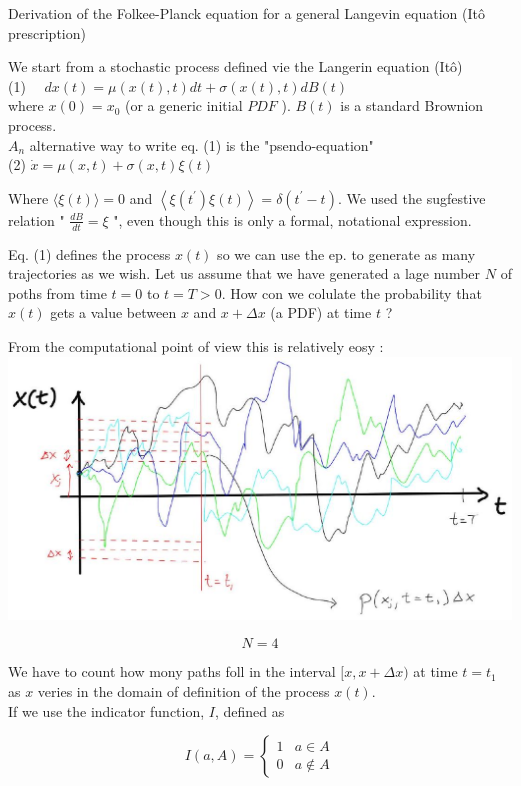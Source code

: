 \documentclass[10pt]{article}
\begin{document}
Derivation of the Folkee-Planck equation for a general Langevin equation (Itô prescription)

We start from a stochastic process defined vie the Langerin equation (Itô)\\
(1) $\quad d x(t)=\mu(x(t), t) d t+\sigma(x(t), t) d B(t)$\\
where $x(0)=x_{0}$ (or a generic initial $P D F$ ). $B(t)$ is a standard Brownion process.\\
$A_{n}$ alternative way to write eq. (1) is the "psendo-equation"\\
(2) $\dot{x}=\mu(x, t)+\sigma(x, t) \xi(t)$

Where $\langle\xi(t)\rangle=0$ and $\left\langle\xi\left(t^{\prime}\right) \xi(t)\right\rangle=\delta\left(t^{\prime}-t\right)$. We used the sugfestive relation " $\frac{d B}{d t}=\xi$ ", even though this is only a formal, notational expression.

Eq. (1) defines the process $x(t)$ so we can use the ep. to generate as many trajectories as we wish. Let us assume that we have generated a lage number $N$ of poths from time $t=0$ to $t=T>0$. How con we colulate the probability that $x(t)$ gets a value between $x$ and $x+\Delta x$ (a PDF) at time $t$ ?

From the computational point of view this is relatively eosy :\\
\includegraphics[max width=\textwidth, center]{2025_10_17_15d569b79a40ed74679eg-02}

$$
N=4
$$

We have to count how mony paths foll in the interval $[x, x+\Delta x)$ at time $t=t_{1}$ as $x$ veries in the domain of definition of the process $x(t)$.\\
If we use the indicator function, $I$, defined as

$$
I(a, A)= \begin{cases}1 & a \in A \\ 0 & a \notin A\end{cases}
$$
\end{document}
